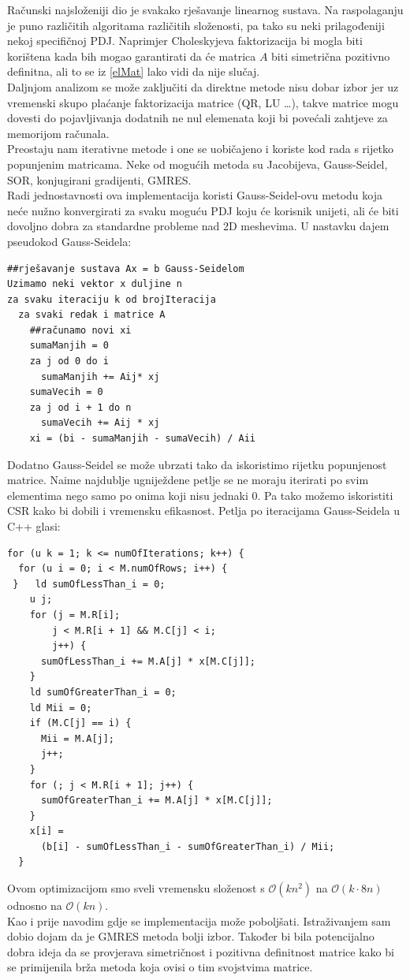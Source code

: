 \documentclass[zavrsnirad]{../fer}
\begin{document}
Računski najsloženiji dio je svakako rješavanje linearnog 
sustava. Na raspolaganju je puno različitih algoritama različitih 
složenosti, pa tako su neki prilagođeniji nekoj specifičnoj PDJ.
Naprimjer Choleskyjeva faktorizacija bi mogla biti korištena kada
bih mogao garantirati da će matrica $A$ biti simetrična pozitivno 
definitna, ali to se iz \ref{elMat} 
lako vidi da nije slučaj.
\bigskip
\\ 
Daljnjom analizom se može zaključiti da direktne metode nisu dobar
izbor jer uz vremenski skupo plaćanje faktorizacija matrice (QR, LU \dots),
takve matrice mogu dovesti do pojavljivanja dodatnih ne nul elemenata 
koji bi povećali zahtjeve za memorijom računala.
\bigskip
\\ 
Preostaju nam iterativne metode i one se uobičajeno i koriste kod 
rada s rijetko popunjenim matricama. Neke od mogućih metoda su 
Jacobijeva, Gauss-Seidel, SOR, konjugirani gradijenti, GMRES.
\bigskip
\\
Radi jednostavnosti ova implementacija koristi Gauss-Seidel-ovu metodu 
koja neće nužno konvergirati za svaku moguću PDJ koju će korisnik unijeti,
ali će biti dovoljno dobra za standardne probleme nad 2D meshevima.
U nastavku dajem pseudokod Gauss-Seidela:
\begin{verbatim}
##rješavanje sustava Ax = b Gauss-Seidelom
Uzimamo neki vektor x duljine n
za svaku iteraciju k od brojIteracija
  za svaki redak i matrice A
    ##računamo novi xi
    sumaManjih = 0
    za j od 0 do i 
      sumaManjih += Aij* xj
    sumaVecih = 0
    za j od i + 1 do n
      sumaVecih += Aij * xj
    xi = (bi - sumaManjih - sumaVecih) / Aii 
\end{verbatim}
Dodatno Gauss-Seidel se može ubrzati tako da iskoristimo rijetku popunjenost
matrice. Naime najdublje ugniježdene petlje se ne moraju iterirati po svim elementima
nego samo po onima koji nisu jednaki $0$. Pa tako možemo iskoristiti CSR kako
bi dobili i vremensku efikasnost. Petlja po iteracijama Gauss-Seidela u C++ glasi:
\begin{verbatim}
for (u k = 1; k <= numOfIterations; k++) {
  for (u i = 0; i < M.numOfRows; i++) {
 }   ld sumOfLessThan_i = 0;
    u j;
    for (j = M.R[i];
        j < M.R[i + 1] && M.C[j] < i;
        j++) {
      sumOfLessThan_i += M.A[j] * x[M.C[j]];
    }
    ld sumOfGreaterThan_i = 0;
    ld Mii = 0;
    if (M.C[j] == i) {
      Mii = M.A[j];
      j++;
    } 
    for (; j < M.R[i + 1]; j++) {
      sumOfGreaterThan_i += M.A[j] * x[M.C[j]];
    }
    x[i] = 
      (b[i] - sumOfLessThan_i - sumOfGreaterThan_i) / Mii; 
  }
\end{verbatim}
Ovom optimizacijom smo sveli vremensku složenost s 
$\mathcal{O}(k n^2)$ na $\mathcal{O}(k \cdot 8n)$ odnosno na $\mathcal{O}(k n)$.
\bigskip
\\
Kao i prije navodim gdje se implementacija može poboljšati. Istraživanjem 
sam dobio dojam da je GMRES metoda bolji izbor. Također bi bila
potencijalno dobra 
ideja da se provjerava simetričnost i pozitivna definitnost matrice 
kako bi se primijenila brža metoda koja ovisi o tim svojstvima 
matrice.
\end{document}
